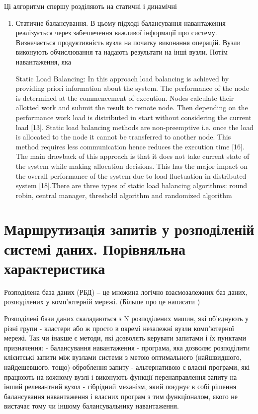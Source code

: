 \documentclass[14pt]{vakthesis}
\begin{document}
Ці алгоритми спершу розділяють на статичні і динамічні
\begin{enumerate}
\item Статичне балансування. В цьому підході балансування навантаження реалізується через забезпечення важливої інформації про систему. Визначається продуктивність вузла на початку виконання операцій. Вузли виконують обчислювання та надають результати на інші вузли. Потім навантаження, яка 


Static Load Balancing: In this approach load balancing is achieved by providing priori information about the system. The
performance of the node is determined at the commencement of execution. Nodes calculate their allotted work and submit the
result to remote node. Then depending on the performance work load is distributed in start without considering the current load
[13]. Static load balancing methods are non-preemptive i.e. once the load is allocated to the node it cannot be transferred to
another node. This method requires less communication hence reduces the execution time [16]. The main drawback of this
approach is that it does not take current state of the system while making allocation decisions. This has the major impact on the
overall performance of the system due to load fluctuation in distributed system [18].There are three types of static load
balancing algorithms: round robin, central manager, threshold algorithm and randomized algorithm

\end{enumerate}

\chapter{Маршрутизація запитів у розподіленій системі даних. Порівняльна характеристика}
Розподілена база даних (РБД) ‒ це множина логічно взаємозалежних баз даних, розподілених у комп’ютерній мережі.
(Більше про це написати  )

Розподілені бази даних  скаладаються з N розподілених машин, які об'єднують у різні групи - кластери або ж просто в окремі незалежні вузли комп'ютерної мережі.
Так чи інакше є методи, які дозволять керувати запитами і їх пунктами призначення:
 - балансування навантаження - програма, яка дозволяє розподілити клієнтські запити між вузлами системи з метою оптимального (найшвидшого, найдешевшого, тощо) оброблення запиту
 - альтернативою є власні програми, які працюють на кожному вузлі і виконують функції перенаправлення запиту на інший релевантний вузол
 - гібрідний механізм, який поєднує в собі рішення балансування навантаження і власних програм з тим функціоналом, якого не вистачає тому чи іншому балансувальнику навантаження.
\end{document}
